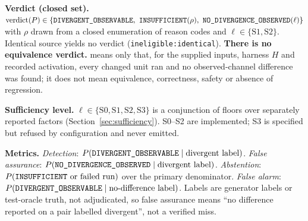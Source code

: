 \textbf{Verdict (closed set).} $\mathrm{verdict}(P)\in\{\DIV,\ \INS(\rho),\ \NDO(\ell)\}$ with $\rho$ drawn from a closed enumeration of reason codes and $\ell\in\{\mathrm{S1},\mathrm{S2}\}$. Identical source yields no verdict (\texttt{ineligible:identical}). \textbf{There is no equivalence verdict.} \NDO{} means only that, for the supplied inputs, harness $H$ and recorded activation, every changed unit ran and no observed-channel difference was found; it does not mean equivalence, correctness, safety or absence of regression.

\textbf{Sufficiency level.} $\ell\in\{\mathrm{S0},\mathrm{S1},\mathrm{S2},\mathrm{S3}\}$ is a conjunction of floors over separately reported factors (Section~\ref{sec:sufficiency}). S0--S2 are implemented; S3 is specified but refused by configuration and never emitted.

\textbf{Metrics.} \emph{Detection}: $P(\texttt{DIVERGENT\_OBSERVABLE}\mid\text{divergent label})$. \emph{False assurance}: $P(\texttt{NO\_DIVERGENCE\_OBSERVED}\mid\text{divergent label})$. \emph{Abstention}: $P(\texttt{INSUFFICIENT}\text{ or failed run})$ over the primary denominator. \emph{False alarm}: $P(\texttt{DIVERGENT\_OBSERVABLE}\mid\text{no-difference label})$. Labels are generator labels or test-oracle truth, not adjudicated, so false assurance means ``no difference reported on a pair labelled divergent'', not a verified miss.
